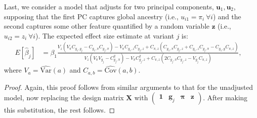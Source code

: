 \documentclass[12pt]{article}
\begin{document}
Last, we consider a model that adjusts for two principal components, $\mathbf{u}_1, \mathbf{u}_2$, supposing that the first PC captures global ancestry (i.e., $u_{i1} = \pi_i \ \forall i$) and the second captures some other feature quantified by a random variable $\mathbf{z}$ (i.e., $u_{i2} = z_i \ \forall i$).
The expected effect size estimate at variant $j$ is:
\begin{align*}
E[\hat\beta_j] & =\beta_1 \frac{V_z(V_\pi C_{g_{1},g_{j}}-C_{g_{1},\pi}C_{g_{j},\pi}) 
                      - V_\pi C_{g_{1},z}C_{g_{j},z}
                      + C_{\pi, z}(C_{g_{1},\pi}C_{g_{j},z} + C_{g_1,z}C_{g_j,\pi} - C_{g_1,g}C_{\pi, z})}                                   {V_z(V_\pi V_{g_j}-C_{g_j,\pi}^2)
                      - V_\pi C_{g_j,z}^2 
                      + C_{\pi, z}(2C_{g_j,\pi}C_{g_j,z} - V_{g_j}C_{\pi, z})}, 
\end{align*}
where $V_a = \widehat{\text{Var}}(a)$ and $C_{a,b} = \widehat{\text{Cov}}(a, b)$.

\begin{proof}
Again, this proof follows from similar arguments to that for the unadjusted model, now replacing the design matrix $\mathbf{X}$ with $\begin{pmatrix} \mathbf{1} & \mathbf{g}_j & \boldsymbol\pi & \mathbf{z} \end{pmatrix}$. After making this substitution, the rest follows. 
\end{proof}
\end{document}
